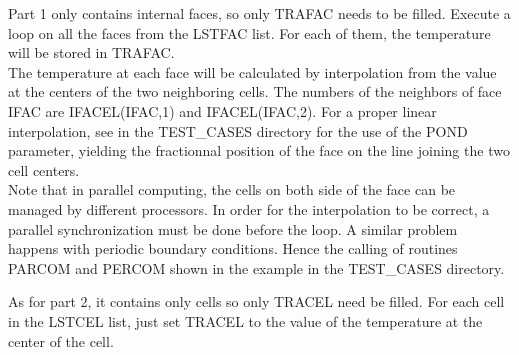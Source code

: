 Part 1 only contains internal faces, so only TRAFAC needs to be filled. Execute
a loop on all the faces from the LSTFAC list. For each of them, the temperature
will be stored in TRAFAC.\\
The temperature at each face will be calculated by interpolation from the value
at the centers of the two neighboring cells. The numbers of the neighbors of
face IFAC are \mbox{IFACEL(IFAC,1)} and \mbox{IFACEL(IFAC,2)}. For a proper
linear interpolation, see in the TEST\_CASES directory for the use of the POND
parameter, yielding the fractionnal position of the face on the line joining the
two cell centers.\\
Note that in parallel computing, the cells on both side of the face can be
managed by different processors. In order for the interpolation to be correct, a
parallel synchronization must be done before the loop. A similar problem happens
with periodic boundary conditions. Hence the calling of routines PARCOM and
PERCOM shown in the example in the TEST\_CASES directory.

As for part 2, it contains only cells so only TRACEL need be filled. For each
cell in the LSTCEL list, just set TRACEL to the value of the temperature at the
center of the cell.
